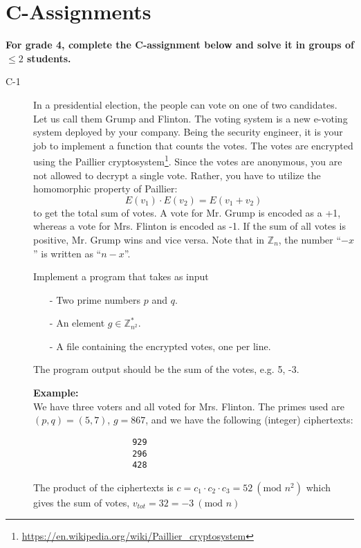 \documentclass{article}
\begin{document}
			\clearpage

			\section*{C-Assignments}
			\textbf{For grade 4, complete the C-assignment below and solve it in groups of $\leq 2$ students.}
			
			\begin{description}
				\item[C-1]{In a presidential election, the people can vote on one of two candidates. Let us call them Grump and Flinton. The voting system is a new e-voting system deployed by your company. Being the
					security engineer, it is your job to implement a function that counts the votes. The votes are encrypted
					using the Paillier cryptosystem\footnote{\url{https://en.wikipedia.org/wiki/Paillier_cryptosystem}}. Since the votes are anonymous, you are not allowed to decrypt a single vote.
					Rather, you have to utilize the homomorphic property of Paillier:
					\[
					E(v_1) \cdot E(v_2) = E(v_1 + v_2)
					\]	
					to get the total sum of votes. A vote for Mr. Grump is encoded as a +1, whereas a vote for Mrs. Flinton
					is encoded as -1. If the sum of all votes is positive, Mr. Grump wins and vice versa. Note that in
					$\mathbb{Z}_n$, the number ``$-x$'' is written as ``$n-x$''.
					
					Implement a program that takes as input
					\begin{itemize}
						\item[-] Two prime numbers $p$ and $q$.
						\item[-] An element $g \in \mathbb{Z}_{n^2}^{*}$.
						\item[-] A file containing the encrypted votes, one per line.
					\end{itemize}
					
					The program output should be the sum of the votes, e.g. 5, -3.
					
					\textbf{Example:}\\
					We have three voters and all voted for Mrs. Flinton. The primes used are
					$(p, q) = (5, 7)$, $g = 867$, and we have the following (integer) ciphertexts:
					\begin{verbatim}
					929
					296
					428
					\end{verbatim}
					The product of the ciphertexts is $c = c_1 \cdot c_2 \cdot c_3 = 52 ~(\textrm{mod } n^2)$
					which gives the sum of votes, $v_{tot} = 32 = -3 ~(\textrm{mod } n)$
					
}
\end{description}
\end{document}

